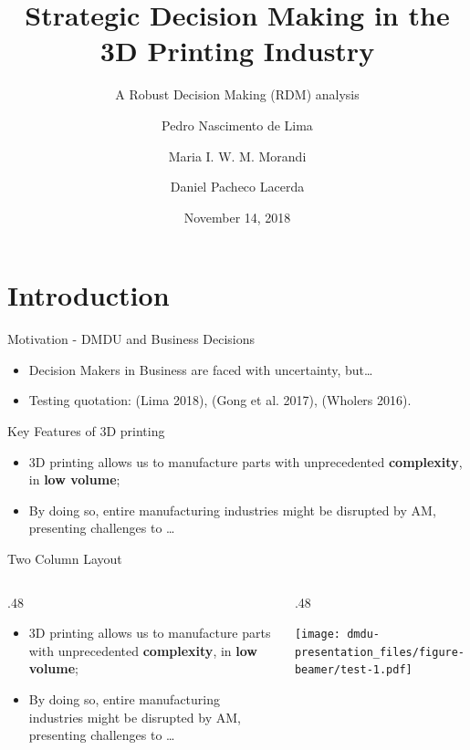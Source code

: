 \documentclass[12pt,ignorenonframetext,]{beamer}
\title{Strategic Decision Making in the 3D Printing Industry}
\subtitle{A Robust Decision Making (RDM) analysis}
\author{Pedro Nascimento de Lima \and Maria I. W. M. Morandi \and Daniel Pacheco Lacerda}
\institute{GMAP Research Group, UNISINOS University, RS, Brazil \and 2018 DMDU Annual Meeting}
\date{November 14, 2018}
\providecommand{\tightlist}{%
  \setlength{\itemsep}{0pt}\setlength{\parskip}{0pt}}
\def\begincols{\begin{columns}}
\def\begincol{\begin{column}}
\def\endcol{\end{column}}
\def\endcols{\end{columns}}
\begin{document}
\frame{\titlepage}

\section{Introduction}\label{introduction}

\begin{frame}{Motivation - DMDU and Business Decisions}

\begin{itemize}
\tightlist
\item
  Decision Makers in Business are faced with uncertainty, but\ldots{}
\item
  Testing quotation: (Lima 2018), (Gong et al. 2017), (Wholers 2016).
\end{itemize}

\end{frame}

\begin{frame}{Key Features of 3D printing}

\begin{itemize}
\tightlist
\item
  3D printing allows us to manufacture parts with unprecedented
  \textbf{complexity}, in \textbf{low volume};
\item
  By doing so, entire manufacturing industries might be disrupted by AM,
  presenting challenges to \ldots{}
\end{itemize}

\end{frame}

\begin{frame}{Two Column Layout}

\begincols
 \begincol{.48\textwidth}

\begin{itemize}
\tightlist
\item
  3D printing allows us to manufacture parts with unprecedented
  \textbf{complexity}, in \textbf{low volume};
\item
  By doing so, entire manufacturing industries might be disrupted by AM,
  presenting challenges to \ldots{}
\end{itemize}

\endcol
\begincol{.48\textwidth}

\texttt{[image: dmdu-presentation\_files/figure-beamer/test-1.pdf]}

\endcol
\endcols

\end{frame}
\end{document}
